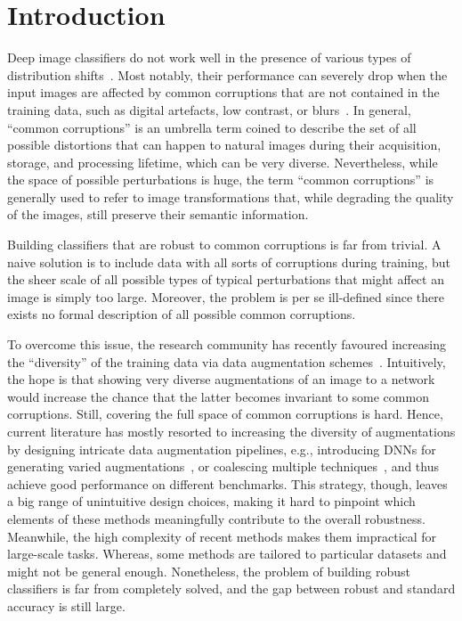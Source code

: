 \documentclass[runningheads]{llncs}
\begin{document}
\section{Introduction}
\label{sec:introduction}
Deep image classifiers do not work well in the presence of various types of distribution shifts~\cite{dodgekaram2016,humans2018,taori2020}. Most notably, their performance can severely drop when the input images are affected by common corruptions that are not contained in the training data, such as digital artefacts, low contrast, or blurs~\cite{corruptions2019,cbar2021}.
In general, ``common corruptions'' is an umbrella term coined to describe the set of all possible distortions that can happen to natural images during their acquisition, storage, and processing lifetime, which can be very diverse.  Nevertheless, while the space of possible perturbations is huge, the term ``common corruptions'' is generally used to refer to image transformations that, while degrading the quality of the images, still preserve their semantic information.

Building classifiers that are robust to common corruptions is far from trivial. A naive solution is to include data with all sorts of corruptions during training, but the sheer scale of all possible types of typical perturbations that might affect an image is simply too large. Moreover, the problem is per se ill-defined since there exists no formal description of all possible common corruptions.




To overcome this issue, the research community has recently favoured increasing the ``diversity'' of the training data via data augmentation schemes~\cite{autoaugment2019,augmix2020,deepaugment2021}. Intuitively, the hope is that showing very diverse augmentations of an image to a network would increase the chance that the latter becomes invariant to some common corruptions. Still, covering the full space of common corruptions is hard. Hence, current literature has mostly resorted to increasing the diversity of augmentations by designing intricate data augmentation pipelines, e.g., introducing DNNs for generating varied augmentations~\cite{deepaugment2021,calian2021}, or coalescing multiple techniques~\cite{augmax2021}, and thus achieve good performance on different benchmarks. This strategy, though, leaves a big range of unintuitive design choices, making it hard to pinpoint which elements of these methods meaningfully contribute to the overall robustness. Meanwhile, the high complexity of recent methods \cite{augmax2021,calian2021} makes them impractical for large-scale tasks. Whereas, some methods are tailored to particular datasets and might not be general enough. Nonetheless, the problem of building robust classifiers is far from completely solved, and the gap between robust and standard accuracy is still large. 
\end{document}
